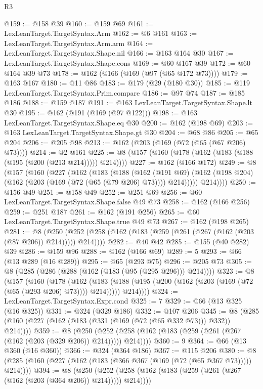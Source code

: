 \begin{lexlean}{R3}
\begin{coremodule}
{{{{{{{{{{{{{{{{@159 := @158 @39
@160 := @159 @69
@161 := LexLeanTarget.TargetSyntax.Arm
@162 := @6 @161
@163 := LexLeanTarget.TargetSyntax.Arm.arm
@164 := LexLeanTarget.TargetSyntax.Shape.nil
@166 := @163 @164 @30
@167 := LexLeanTarget.TargetSyntax.Shape.cons
@169 := @60 @167 @39
@172 := @60 @164 @39 @73
@178 := @162 (@166 (@169 (@97 (@65 @172 @73))))
@179 := @163 @167
@180 := @11 @86
@183 := @179 (@29 (@180 @30))
@185 := @119 LexLeanTarget.TargetSyntax.Prim.compare
@186 := @97 @74
@187 := @185 @186
@188 := @159 @187
@191 := @163 LexLeanTarget.TargetSyntax.Shape.lt @30
@195 := @162 (@191 (@169 (@97 @122)))
@198 := @163 LexLeanTarget.TargetSyntax.Shape.eq @30
@200 := @162 (@198 @69)
@203 := @163 LexLeanTarget.TargetSyntax.Shape.gt @30
@204 := @68 @86
@205 := @65 @204
@206 := @205 @98
@213 := @162 (@203 (@169 (@72 (@65 (@67 @206) @73))))
@214 := @2 @161
@225 := @8 (@157 (@160 (@178 (@162 (@183 (@188 (@195 (@200 (@213 @214))))) @214))))
@227 := @162 (@166 @172)
@249 := @8
    (@157
      (@160
        (@227
          (@162
            (@183
              (@188
                (@162
                  (@191 @69)
                  (@162 (@198 @204) (@162 (@203 (@169 (@72 (@65 (@79 @206) @73)))) @214)))))
            @214))))
@250 := @156 @49
@251 := @158 @49
@252 := @251 @69
@256 := @60 LexLeanTarget.TargetSyntax.Shape.false @49 @73
@258 := @162 (@166 @256)
@259 := @251 @187
@261 := @162 (@191 @256)
@265 := @60 LexLeanTarget.TargetSyntax.Shape.true @49 @73
@267 := @162 (@198 @265)
@281 := @8
    (@250 (@252 (@258 (@162 (@183 (@259 (@261 (@267 (@162 (@203 (@87 @206)) @214))))) @214))))
@282 := @40 @42
@285 := @155 (@40 @282) @39
@286 := @159 @96
@288 := @162 (@166 @69)
@289 := 5
@293 := @66 (@13 @289 (@16 @289))
@295 := @65 (@293 @75)
@296 := @205 @73
@305 := @8 (@285 (@286 (@288 (@162 (@183 (@95 (@295 @296))) @214))))
@323 := @8
    (@157
      (@160
        (@178
          (@162
            (@183 (@188 (@195 (@200 (@162 (@203 (@169 (@72 (@65 (@293 @206) @73)))) @214)))))
            @214))))
@324 := LexLeanTarget.TargetSyntax.Expr.cond
@325 := 7
@329 := @66 (@13 @325 (@16 @325))
@331 := @324 (@329 @186)
@332 := @107 @206
@345 := @8 (@285 (@160 (@227 (@162 (@183 (@331 (@169 (@72 (@65 @332 @73))) @332)) @214))))
@359 := @8
    (@250 (@252 (@258 (@162 (@183 (@259 (@261 (@267 (@162 (@203 (@329 @206)) @214))))) @214))))
@360 := 9
@364 := @66 (@13 @360 (@16 @360))
@366 := @324 (@364 @186)
@367 := @115 @206
@380 := @8 (@285 (@160 (@227 (@162 (@183 (@366 @367 (@169 (@72 (@65 @367 @73))))) @214))))
@394 := @8
    (@250 (@252 (@258 (@162 (@183 (@259 (@261 (@267 (@162 (@203 (@364 @206)) @214))))) @214))))
}}}}}}}}}}}}}}}}
\end{coremodule}
\end{lexlean}
